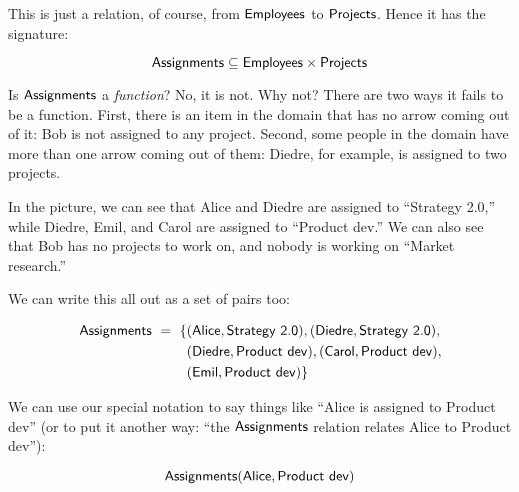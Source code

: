 \documentclass[../../../main.tex]{subfiles}
\begin{document}
\begin{fexample}
This is just a relation, of course, from $\mathsf{Employees}$ to $\mathsf{Projects}$. Hence it has the signature: 

\begin{equation*}
  \mathsf{Assignments} \subseteq \mathsf{Employees} \times \mathsf{Projects}
\end{equation*}

\begin{aside}
  \begin{remark}
    Is $\mathsf{Assignments}$ a \emph{function}? No, it is not. Why not? There are two ways it fails to be a function. First, there is an item in the domain that has no arrow coming out of it: Bob is not assigned to any project. Second, some people in the domain have more than one arrow coming out of them: Diedre, for example, is assigned to two projects.
  \end{remark}
\end{aside}

In the picture, we can see that Alice and Diedre are assigned to ``Strategy 2.0,'' while Diedre, Emil, and Carol are assigned to ``Product dev.'' We can also see that Bob has no projects to work on, and nobody is working on ``Market research.''

We can write this all out as a set of pairs too:

\begin{align*}
  \mathsf{Assignments}~=~\{ 
    &(\mathsf{Alice}, \mathsf{Strategy~2.0}), (\mathsf{Diedre}, \mathsf{Strategy~2.0}), \\
  ~ &(\mathsf{Diedre}, \mathsf{Product~dev}), (\mathsf{Carol}, \mathsf{Product~dev}), \\
  ~ &(\mathsf{Emil}, \mathsf{Product~dev}) \}
\end{align*}

We can use our special notation to say things like ``Alice is assigned to Product dev'' (or to put it another way: ``the $\mathsf{Assignments}$ relation relates Alice to Product dev''):

\begin{equation*}
  \mathsf{Assignments}(\mathsf{Alice}, \mathsf{Product~dev})
\end{equation*}

\end{fexample}
\end{document}
